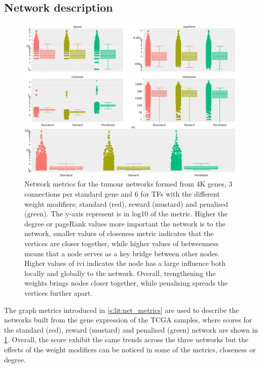 \subsection{Network description} \label{s:N_I:tum_describe}

\begin{figure}[!t]  
\centering
\includegraphics[width=1.0\textwidth,keepaspectratio]{Sections/Network_I/Resources/Tum_network/NetworkMetricsComp_6TF.png}
    \caption{Network metrics for the tumour networks formed from 4K genes, 3 connections per standard gene and 6 for TFs with the different weight modifiers; standard (red), reward (mustard) and penalised (green). The y-axis represent is in log10 of the metric. Higher the degree or pageRank values more important the network is to the network, smaller values of closeness metric indicates that the vertices are closer together, while higher values of betweenness means that a node serves as a key bridge between other nodes. Higher values of \acrlong{ivi} indicates the node has a large influence both locally and globally to the network. Overall, trengthening the weights brings nodes closer together, while penalising spreads the vertices further apart.  }
    \label{fig:N_I:net_metrics_tum}
\end{figure}

The graph metrics introduced in \cref{s:lit:net_metrics} are used to describe the networks built from the gene expression of the TCGA samples, where scores for the standard (red), reward (mustard) and penalised (green) network are shown in \cref{fig:N_I:net_metrics_tum}. Overall, the score exhibit the same trends across the three networks but the effects of the weight modifiers can be noticed in some of the metrics, closeness or degree.

